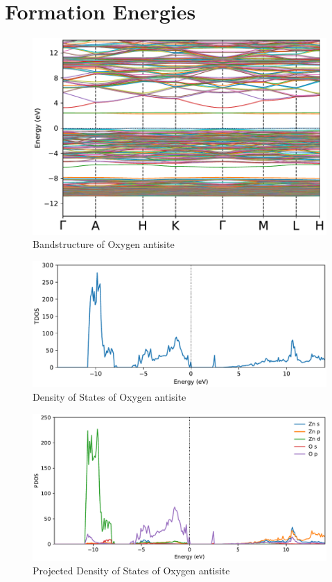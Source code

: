 \section{Formation Energies}
\begin{figure}[tbh!]
	\centering
	\includegraphics[width=0.7\linewidth]{"images/bands_O-antisite"}
	\caption[Bandstructure of Oxygen antisite]{Bandstructure of Oxygen antisite}
\end{figure}

\begin{figure}[tbh!]
	\centering
	\includegraphics[width=0.7\linewidth]{"images/dos_O-antisite"}
	\caption[Density of states of Oxygen antisite]{Density of States of Oxygen antisite}
\end{figure}

\begin{figure}[tbh!]
	\centering
	\includegraphics[width=0.7\linewidth]{"images/pdos_O-antisite"}
	\caption[Projected Density of states of Oxygen antisite]{Projected Density of States of Oxygen antisite}
\end{figure}

